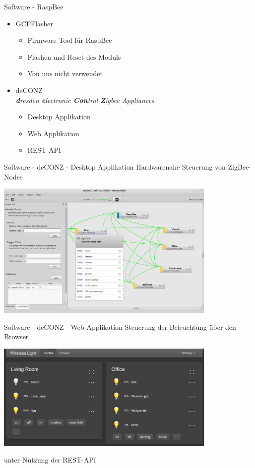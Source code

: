 \begin{frame}{Software - RaspBee}
  \Large
  \begin{itemize}
    \item GCFFlasher
    \begin{itemize}
      \Large
      \item Firmware-Tool für RaspBee
      \item Flashen und Reset des Moduls
      \item Von uns nicht verwendet
      \newline
    \end{itemize}
	\item deCONZ\\
      \normalsize{\textit{\textbf dresden \textbf electronic \textbf{Con}trol
        \textbf Zigbee Appliances}}
    \begin{itemize}
      \Large
      \item Desktop Applikation
      \item Web Applikation
      \item REST API
    \end{itemize}
  \end{itemize}
\end{frame}

\begin{frame}{Software - deCONZ - Desktop Applikation}
  \Large
  Hardwarenahe Steuerung von ZigBee-Nodes
  \begin{center}
    \includegraphics[width=0.8\textwidth]{images/deconz_app}
  \end{center}
\end{frame}

\begin{frame}{Software - deCONZ - Web Applikation}
  \Large
  Steuerung der Beleuchtung über den Browser
  \begin{center}
    \includegraphics[width=0.8\textwidth]{images/deconz_web}
  \end{center}
  unter Nutzung der REST-API
\end{frame}

